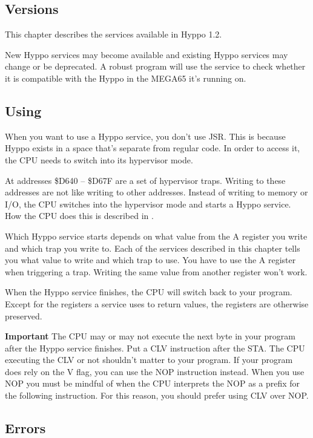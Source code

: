 \filbreak
\subsection{Versions}

This chapter describes the services available in Hyppo 1.2.

New Hyppo services may become available and existing Hyppo services may change
or be deprecated. A robust program will use the 
service to check whether it is compatible with the Hyppo in the MEGA65 it's
running on.


\subsection{Using}
When you want to use a Hyppo service, you don't use JSR. This is because
Hyppo exists in a space that's separate from regular code. In order to
access it, the CPU needs to switch into its hypervisor mode.

At addresses \$D640 -- \$D67F are a set of hypervisor traps. Writing to these
addresses are not like writing to other addresses. Instead of writing to memory
or I/O, the CPU switches into the hypervisor mode and starts a Hyppo service.
How the CPU does this is described in .

Which Hyppo service starts depends on what value from the A register you
write and which trap you write to. Each of the services described in this
chapter tells you what value to write and which trap to use. You have to use the
A register when triggering a trap. Writing the same value from another register
won't work.

When the Hyppo service finishes, the CPU will switch back to your program.
Except for the registers a service uses to return values, the registers are
otherwise preserved.

\textbf{Important} The CPU may or may not execute the next byte in your
program after the Hyppo service finishes. Put a CLV instruction after the STA.
The CPU executing the CLV or not shouldn't matter to your program. If your
program does rely on the V flag, you can use the NOP instruction instead. When
you use NOP you must be mindful of when the CPU interprets the NOP as a prefix
for the following instruction. For this reason, you should prefer using CLV
over NOP.

\subsection{Errors}

